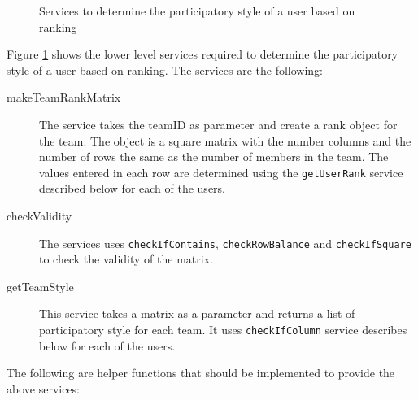 \begin{figure}[htb]
\begin{center}
\end{center}
\caption{Services to determine the participatory style of a user based on ranking \label{fig:rank_functionalRequirements}}
\end{figure}

Figure \ref{fig:rank_functionalRequirements} shows the lower level services required to determine the participatory style of a user based on ranking. The services are the following:

\begin{description}

\item[makeTeamRankMatrix] The service takes the teamID as parameter and create a rank object for the team. The object is a square matrix with the number columns and the number of rows the same as the number of members in the team. The values entered in each row are determined using the \texttt{getUserRank} service described below for each of the users. 



\item[checkValidity] The services uses \texttt{checkIfContains}, \texttt{checkRowBalance} and \texttt{checkIfSquare} to check the validity of the matrix.



\item[getTeamStyle] This service takes a matrix as a parameter and returns a list of participatory style for each team. It uses \texttt{checkIfColumn} service describes below for each of the users.



 


\end{description}  
The following are helper functions that should be implemented to provide the above services:

